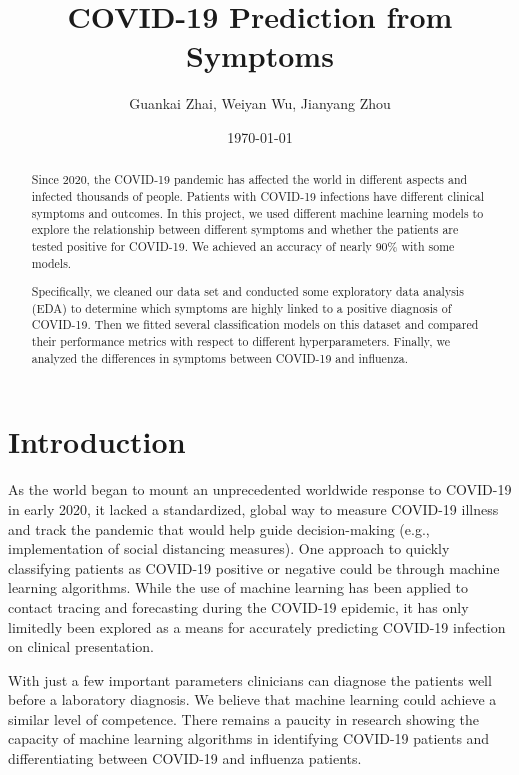 \documentclass[a4paper, 11pt]{article}
\title{\vspace{-1cm}COVID-19 Prediction from Symptoms}
\author{Guankai Zhai, Weiyan Wu, Jianyang Zhou}
\date{\today} %
\begin{document}
\maketitle

\begin{abstract}
Since 2020, the COVID-19 pandemic has affected the world in different aspects and infected thousands of people. Patients with COVID-19 infections have different clinical symptoms and outcomes. In this project, we used different machine learning models to explore the relationship between different symptoms and whether the patients are tested positive for COVID-19. We achieved an accuracy of nearly 90\% with some models. \par
Specifically, we cleaned our data set and conducted some exploratory data analysis (EDA) to determine which symptoms are highly linked to a positive diagnosis of COVID-19. Then we fitted several classification models on this dataset and compared their performance metrics with respect to different hyperparameters. Finally, we analyzed the differences in symptoms between COVID-19 and influenza. 



\end{abstract}
\section*{Introduction}
As the world began to mount an unprecedented worldwide response to COVID-19 in early 2020, it lacked a standardized, global way to measure COVID-19 illness and track the pandemic that would help guide decision-making (e.g., implementation of social distancing measures). One approach to quickly classifying patients as COVID-19 positive or negative could be through machine learning algorithms. While the use of machine learning has been applied to contact tracing and forecasting during the COVID-19 epidemic, it has only limitedly been explored as a means for accurately predicting COVID-19 infection on clinical presentation. \par 

With just a few important parameters clinicians can diagnose the patients well before a laboratory diagnosis. We believe that machine learning could achieve a similar level of competence. There remains a paucity in research showing the capacity of machine learning algorithms in identifying COVID-19 patients and differentiating between COVID-19 and influenza patients. \par
\end{document}
